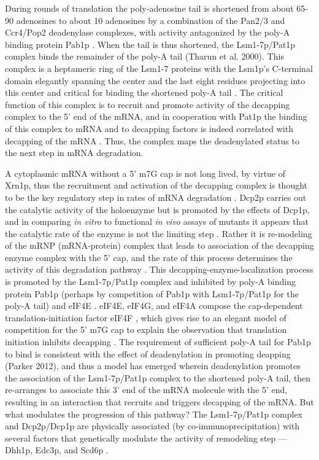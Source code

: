During rounds of
translation the poly-adenosine tail is shortened from about 65-90
adenosines to about 10 adenosines by a combination of the Pan2/3 and
Ccr4/Pop2 deadenylase complexes, with activity antagonized by the
poly-A binding protein Pab1p
\parencite{parker2012rna,decker1993turnover}.
When the tail is thus shortened, the Lsm1-7p/Pat1p
complex binds the remainder of the poly-A tail (Tharun et al. 2000).
This complex is a heptameric ring of the Lsm1-7 proteins with the
Lsm1p's C-terminal domain elegantly spanning the center 
\parencite{sharif2013architecture}
and the last eight residues projecting into this center
and critical for binding the shortened poly-A tail 
\parencite{chowdhury2016mutagenic}.
The critical function of this complex is to recruit and promote
activity of the decapping complex to the 5' end of the mRNA, and in
cooperation with Pat1p \parencite{chowdhury2014pat1}
the binding of this
complex to mRNA and to decapping factors is indeed correlated with
decapping of the mRNA 
\parencite{chowdhury2009activation}.
Thus, the complex
maps the deadenylated status to the next step in mRNA degradation.  

A
cytoplasmic mRNA without a 5' m7G cap is not long lived, by virtue of
Xrn1p, thus the recruitment and activation of the decapping complex is
thought to be the key regulatory step in rates of mRNA degradation
\parencite{coller2004eukaryotic}.
Dcp2p carries out the catalytic activity of
the holoenzyme but is promoted by the effects of Dcp1p, and in
comparing \textit{in vitro} to functional \textit{in vivo} assays 
of mutants it appears
that the catalytic rate of the enzyme is not the limiting step 
\parencite{tharun1999analysis}. 
Rather it is re-modeling of the mRNP (mRNA-protein) complex that
leads to association of the decapping enzyme complex with the 5' cap,
and the rate of this process determines the activity of this
degradation pathway 
\parencite{tharun2001targeting}.
This
decapping-enzyme-localization process is promoted by the Lsm1-7p/Pat1p
complex and inhibited by poly-A binding protein Pab1p (perhaps by
competition of Pab1p with Lsm1-7p/Pat1p for the poly-A tail) and eIF4E
\parencite{coller2004eukaryotic,caponigro1996mechanisms}
. eIF4E, eIF4G, and
eIF4A compose the cap-dependent translation-initiation factor eIF4F
\parencite{dever2016mechanism}, 
which gives rise to an elegant model of competition for the 5' m7G cap
to explain the observation that
translation initiation inhibits decapping
\parencite{huch2014interrelations}.
The requirement of sufficient
poly-A tail for Pab1p to bind is consistent with the effect of
deadenylation in promoting deapping (Parker 2012), and thus a model
has emerged wherein deadenylation promotes the association of the 
Lsm1-7p/Pat1p complex to the shortened poly-A tail, then re-arranges
to associate this 3' end of the mRNA molecule with the 5' end,
resulting in an interaction that recruits and triggers decapping
of the mRNA. But what modulates the progression of this pathway?
The Lsm1-7p/Pat1p
complex and Dcp2p/Dcp1p are physically associated (by
co-immunoprecipitation) with several factors that genetically modulate
the activity of remodeling step ---Dhh1p, Edc3p, and Scd6p 
\parencite{nissan2010decapping}.

